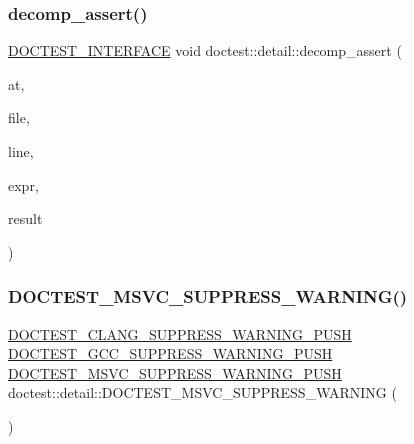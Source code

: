 \subsubsection{\texorpdfstring{decomp\+\_\+assert()}{decomp\_assert()}}
{\footnotesize\ttfamily \mbox{\hyperlink{doctest_8h_a9c16ffc635ec47f07797d21ede26b1a5}{D\+O\+C\+T\+E\+S\+T\+\_\+\+I\+N\+T\+E\+R\+F\+A\+CE}} void doctest\+::detail\+::decomp\+\_\+assert (\begin{DoxyParamCaption}\item[{\mbox{\hyperlink{namespacedoctest_1_1assert_type_ae1bb5bed722f34f1c38b83cb19d326d3}{assert\+Type\+::\+Enum}}}]{at,  }\item[{const char $\ast$}]{file,  }\item[{int}]{line,  }\item[{const char $\ast$}]{expr,  }\item[{\mbox{\hyperlink{structdoctest_1_1detail_1_1_result}{Result}}}]{result }\end{DoxyParamCaption})}

\mbox{\label{namespacedoctest_1_1detail_a3b966d87ac1e25498fae773355c43d90}} 
\subsubsection{\texorpdfstring{D\+O\+C\+T\+E\+S\+T\+\_\+\+M\+S\+V\+C\+\_\+\+S\+U\+P\+P\+R\+E\+S\+S\+\_\+\+W\+A\+R\+N\+I\+N\+G()}{DOCTEST\_MSVC\_SUPPRESS\_WARNING()}}
{\footnotesize\ttfamily \mbox{\hyperlink{doctest_8h_a628491cf2971a026350d5401986bf6d3}{D\+O\+C\+T\+E\+S\+T\+\_\+\+C\+L\+A\+N\+G\+\_\+\+S\+U\+P\+P\+R\+E\+S\+S\+\_\+\+W\+A\+R\+N\+I\+N\+G\+\_\+\+P\+U\+SH}} \mbox{\hyperlink{doctest_8h_a8015d10af2883db80a955ce0d523886d}{D\+O\+C\+T\+E\+S\+T\+\_\+\+G\+C\+C\+\_\+\+S\+U\+P\+P\+R\+E\+S\+S\+\_\+\+W\+A\+R\+N\+I\+N\+G\+\_\+\+P\+U\+SH}} \mbox{\hyperlink{doctest_8h_aec6d713a9dde361b8e68afe78c5bf3cf}{D\+O\+C\+T\+E\+S\+T\+\_\+\+M\+S\+V\+C\+\_\+\+S\+U\+P\+P\+R\+E\+S\+S\+\_\+\+W\+A\+R\+N\+I\+N\+G\+\_\+\+P\+U\+SH}} doctest\+::detail\+::\+D\+O\+C\+T\+E\+S\+T\+\_\+\+M\+S\+V\+C\+\_\+\+S\+U\+P\+P\+R\+E\+S\+S\+\_\+\+W\+A\+R\+N\+I\+NG (\begin{DoxyParamCaption}\item[{4388}]{ }\end{DoxyParamCaption})}

